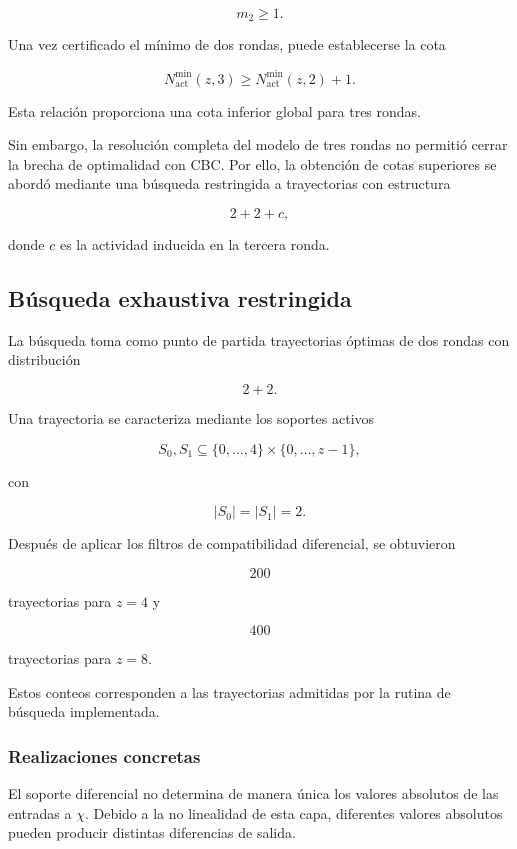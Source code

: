 \[
m_2 \geq 1.
\]

Una vez certificado el mínimo de dos rondas, puede establecerse la cota

\[
N_{\mathrm{act}}^{\min}(z,3)
\geq
N_{\mathrm{act}}^{\min}(z,2)+1.
\]

Esta relación proporciona una cota inferior global para tres rondas.

Sin embargo, la resolución completa del modelo de tres rondas no permitió
cerrar la brecha de optimalidad con CBC. Por ello, la obtención de cotas
superiores se abordó mediante una búsqueda restringida a trayectorias con
estructura

\[
2+2+c,
\]

donde $c$ es la actividad inducida en la tercera ronda.


\subsection{Búsqueda exhaustiva restringida}
\label{subsec:busqueda_exhaustiva_restringida}

La búsqueda toma como punto de partida trayectorias óptimas de dos rondas
con distribución

\[
2+2.
\]

Una trayectoria se caracteriza mediante los soportes activos

\[
S_0,
S_1
\subseteq
\{0,\ldots,4\}
\times
\{0,\ldots,z-1\},
\]

con

\[
|S_0|=|S_1|=2.
\]

Después de aplicar los filtros de compatibilidad diferencial, se obtuvieron

\[
200
\]

trayectorias para $z=4$ y

\[
400
\]

trayectorias para $z=8$.

Estos conteos corresponden a las trayectorias admitidas por la rutina de
búsqueda implementada.


\subsubsection{Realizaciones concretas}

El soporte diferencial no determina de manera única los valores absolutos
de las entradas a $\chi$. Debido a la no linealidad de esta capa, diferentes
valores absolutos pueden producir distintas diferencias de salida.

